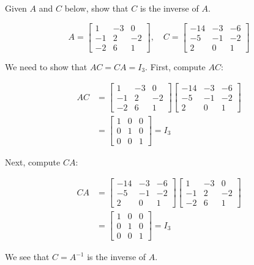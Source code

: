 \begin{example}
    Given $A$ and $C$ below, show that $C$ is the inverse of $A$.

    \[
    A=\left[\begin{array}{rrr}
    1 & -3 & 0 \\
    -1 & 2 & -2 \\
    -2 & 6 & 1
    \end{array}\right], \quad C=\left[\begin{array}{rrr}
    -14 & -3 & -6 \\
    -5 & -1 & -2 \\
    2 & 0 & 1
    \end{array}\right]
    \]
    \label{ex:inverse2}
\end{example}

\begin{solution}
    We need to show that $A C = C A = I_3$. First, compute $AC$:

    \[
    \begin{aligned}
    A C &=\left[\begin{array}{rrr}
    1 & -3 & 0 \\
    -1 & 2 & -2 \\
    -2 & 6 & 1
    \end{array}\right]\left[\begin{array}{rrr}
    -14 & -3 & -6 \\
    -5 & -1 & -2 \\
    2 & 0 & 1
    \end{array}\right] \\
    &=\left[\begin{array}{rrr}
    1 & 0 & 0 \\
    0 & 1 & 0 \\
    0 & 0 & 1
    \end{array}\right]=I_3
    \end{aligned}
    \]

    Next, compute $CA$:

    \[
    \begin{aligned}
    C A &=\left[\begin{array}{rrr}
    -14 & -3 & -6 \\
    -5 & -1 & -2 \\
    2 & 0 & 1
    \end{array}\right]\left[\begin{array}{rrr}
    1 & -3 & 0 \\
    -1 & 2 & -2 \\
    -2 & 6 & 1
    \end{array}\right] \\
    &=\left[\begin{array}{rrr}
    1 & 0 & 0 \\
    0 & 1 & 0 \\
    0 & 0 & 1
    \end{array}\right]=I_3
    \end{aligned}
    \]

    We see that $C=A^{-1}$ is the inverse of $A$. \end{solution}

